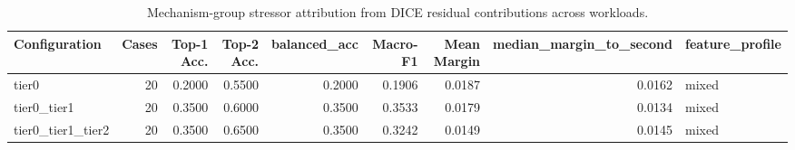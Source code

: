 \begin{table}[t]
\centering
\caption{Mechanism-group stressor attribution from DICE residual contributions across workloads.}
\label{tab:dice_stressor_diagnosis}
\footnotesize
\begin{tabular}{lrrrrrrrl}
\toprule
Configuration & Cases & Top-1 Acc. & Top-2 Acc. & balanced_acc & Macro-F1 & Mean Margin & median_margin_to_second & feature_profile \\
\midrule
tier0 & 20 & 0.2000 & 0.5500 & 0.2000 & 0.1906 & 0.0187 & 0.0162 & mixed \\
tier0_tier1 & 20 & 0.3500 & 0.6000 & 0.3500 & 0.3533 & 0.0179 & 0.0134 & mixed \\
tier0_tier1_tier2 & 20 & 0.3500 & 0.6500 & 0.3500 & 0.3242 & 0.0149 & 0.0145 & mixed \\
\bottomrule
\end{tabular}

\end{table}
